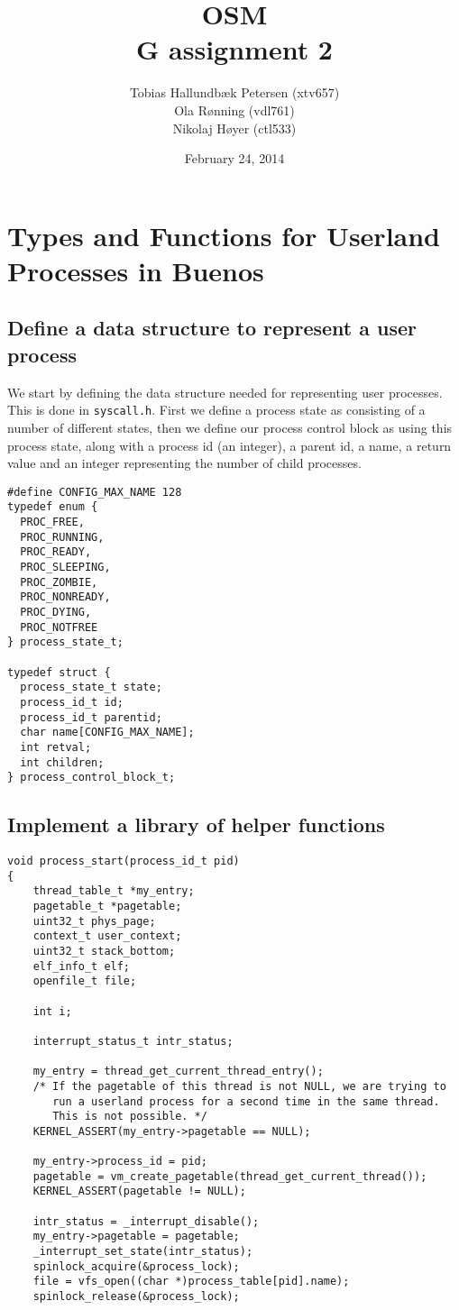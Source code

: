 \documentclass[a4paper,12pt]{article}
\title{OSM\\G assignment 2}
\author{Tobias Hallundbæk Petersen (xtv657)\\Ola Rønning (vdl761)\\Nikolaj Høyer (ctl533)}
\date{February 24, 2014}
\begin{document}
\maketitle
\tableofcontents
\newpage
\section{Types and Functions for Userland Processes in Buenos}
\subsection{Define a data structure to represent a user process}

We start by defining the data structure needed for representing user processes. This is done in \texttt{syscall.h}. First we define a process state as consisting of a number of different states, then we define our process control block as using this process state, along with a process id (an integer), a parent id, a name, a return value and an integer representing the number of child processes.
\begin{lstlisting}
#define CONFIG_MAX_NAME 128
typedef enum {
  PROC_FREE,
  PROC_RUNNING,
  PROC_READY,
  PROC_SLEEPING,
  PROC_ZOMBIE,
  PROC_NONREADY,
  PROC_DYING,
  PROC_NOTFREE
} process_state_t;

typedef struct {
  process_state_t state;
  process_id_t id;
  process_id_t parentid;
  char name[CONFIG_MAX_NAME];
  int retval;
  int children;
} process_control_block_t;
\end{lstlisting}

\subsection{Implement a library of helper functions}

\begin{lstlisting}
void process_start(process_id_t pid)
{
    thread_table_t *my_entry;
    pagetable_t *pagetable;
    uint32_t phys_page;
    context_t user_context;
    uint32_t stack_bottom;
    elf_info_t elf;
    openfile_t file;

    int i;

    interrupt_status_t intr_status;
    
    my_entry = thread_get_current_thread_entry();
    /* If the pagetable of this thread is not NULL, we are trying to
       run a userland process for a second time in the same thread.
       This is not possible. */
    KERNEL_ASSERT(my_entry->pagetable == NULL);
    
    my_entry->process_id = pid;
    pagetable = vm_create_pagetable(thread_get_current_thread());
    KERNEL_ASSERT(pagetable != NULL);

    intr_status = _interrupt_disable();
    my_entry->pagetable = pagetable;
    _interrupt_set_state(intr_status);
    spinlock_acquire(&process_lock);
    file = vfs_open((char *)process_table[pid].name);
    spinlock_release(&process_lock);
\end{lstlisting}
\end{document}
